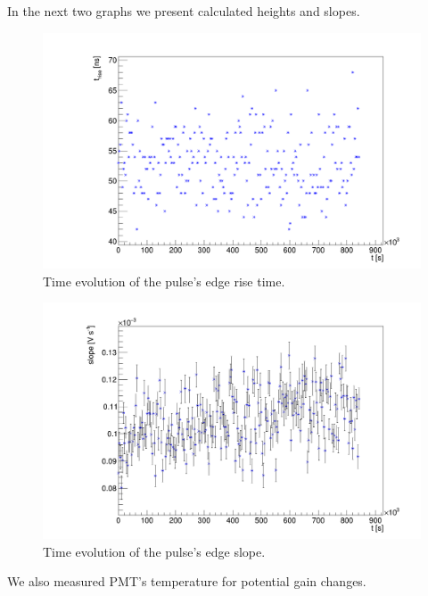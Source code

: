 In the next two graphs we present calculated heights and slopes.

\begin{figure}[H]
 \centering
 \includegraphics[scale=0.3]{./pictures/rise}
 \caption{Time evolution of the pulse's edge rise time.}
 \label{rise1}
\end{figure}

\begin{figure}[H]
 \centering
 \includegraphics[scale=0.3]{./pictures/Slope}
 \caption{Time evolution of the pulse's edge slope.}
 \label{slope1}
\end{figure}

We also measured PMT's temperature for potential gain changes.
 
